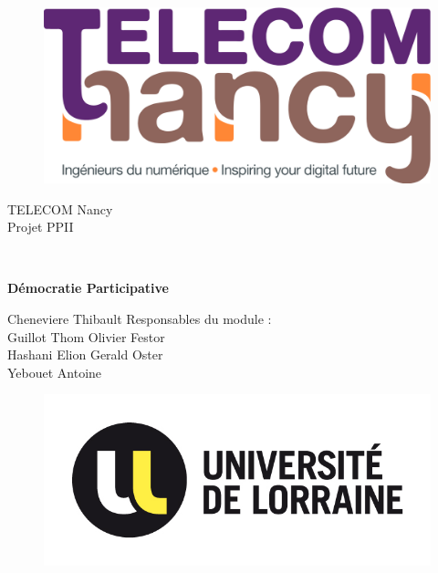 
\thispagestyle{empty}

\vskip 2cm

\begin{figure}[ht!]
    \centering
    \includegraphics[scale = 0.11]{logoTNCY.png}
    \label{fig:logo_TNCY}
\end{figure}
\vskip 0.3cm
\begin{center}
\begin{LARGE}
TELECOM Nancy
\\
\vskip 2.7cm
Projet PPII
\end{LARGE}
\\
\vskip 2.7cm
\hline
\vskip 1.8cm
\begin{Huge}
\textbf{Démocratie Participative}
\end{Huge}
\vskip 1.8cm
\hline
\end{center}

\vskip 1.5cm

\begin{Large}
\noindent Cheneviere Thibault 
\hfill {} Responsables du module :\\
Guillot Thom 
\hfill{} Olivier Festor\\
Hashani Elion
\hfill{} Gerald Oster\\
Yebouet Antoine\\

\end{Large}

\vskip 1cm
\begin{figure}
    \centering
    \includegraphics[scale = 1.8]{logo_UL.jpg}
\end{figure}

